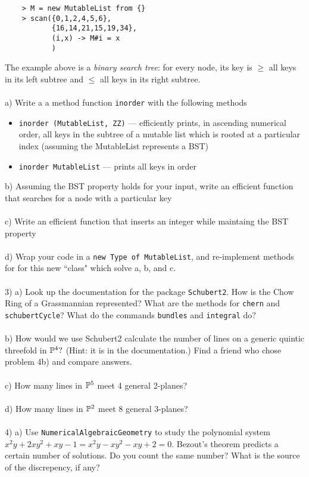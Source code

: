 \documentclass{article}
\begin{document}
\begin{verbatim}
    > M = new MutableList from {}
    > scan({0,1,2,4,5,6}, 
           {16,14,21,15,19,34},
           (i,x) -> M#i = x
           )
\end{verbatim}
The example above is a \emph{binary search tree}: for every node, its key is $\ge$ all keys in its left subtree and $\le $ all keys in its right subtree.\\\\
a) Write a a method function \texttt{inorder} with the following methods
\begin{itemize}
    \item \texttt{inorder (MutableList, ZZ)} --- efficiently prints, in ascending numerical order, all keys in the subtree of a mutable list which is rooted at a particular index (assuming the MutableList represents a BST)
    \item \texttt{inorder MutableList} --- prints all keys in order
\end{itemize}
b) Assuming the BST property holds for your input, write an efficient function that searches for a node with a particular key\\\\
c) Write an efficient function that inserts an integer while maintaing the BST property\\\\
d) Wrap your code in a \texttt{new Type of MutableList}, and re-implement methods for for this new ``class" which solve a, b, and c.\\\\
3) a) Look up the documentation for the package \texttt{Schubert2}. How is the Chow Ring of a Grassmannian represented? What are the methods for \texttt{chern} and \texttt{schubertCycle}? What do the commands \texttt{bundles} and \texttt{integral} do?\\\\
b) How would we use Schubert2 calculate the number of lines on a generic quintic threefold in $\mathbb{P}^4?$ (Hint: it is in the documentation.) Find a friend who chose problem 4b) and compare answers.\\\\
c) How many lines in $\mathbb{P}^5$ meet 4 general 2-planes?\\\\
d) How many lines in $\mathbb{P}^2$ meet 8 general 3-planes?\\\\
4) a) Use \texttt{NumericalAlgebraicGeometry} to study the polynomial system $x^2y+2xy^2+xy-1=x^2y-xy^2-xy+2=0.$ Bezout's theorem predicts a certain number of solutions. Do you count the same number? What is the source of the discrepency, if any? \\\\
\end{document}
